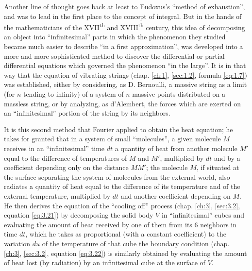 \documentclass[12pt,a4paper,leqno,twoside]{extbook}
\newcommand{\supth}{\texorpdfstring{\textsuperscript{th}}{th}}
\begin{document}
Another line of thought goes back at least to Eudoxus's ``method of exhaustion'', and was to lead in the first place to the concept of integral. But in the hands of the mathematicians of the XVII\supth{} and XVIII\supth{} century, this idea of decomposing an object into ``infinitesimal'' parts in which the phenomenon they studied became much easier to describe ``in a first approximation'', was developed into a more and more sophisticated method to discover the differential or partial differential equations which governed the phenomenon ``in the large''. It is in that way that the equation of vibrating strings (chap. \ref{ch:1}, \ref{sec:1.2}, formula \eqref{eq:1.7}) was established, either by considering, as D. Bernoulli, a massive string as a limit (for \(n\) tending to infinity) of a system of \(n\) massive points distributed on a massless string, or by analyzing, as d'Alembert, the forces which are exerted on an ``infinitesimal'' portion of the string by its neighbors.

It is this second method that Fourier applied to obtain the heat equation; he takes for granted that in a system of small ``molecules'', a given molecule \(M\) receives in an ``infinitesimal'' time \(dt\) a quantity of heat from another molecule \(M'\) equal to the difference of temperatures of \(M\) and \(M'\), multiplied by \(dt\) and by a coefficient depending only on the distance \(MM'\); the molecule \(M\), if situated at the surface separating the system of molecules from the external world, also radiates a quantity of heat equal to the difference of its temperature and of the external temperature, multiplied by \(dt\) and another coefficient depending on \(M\). He then derives the equation of the ``cooling off'' process (chap. \ref{ch:3}, \ref{sec:3.2}, equation \eqref{eq:3.21}) by decomposing the solid body \(V\) in ``infinitesimal'' cubes and evaluating the amount of heat received by one of them from its 6 neighbors in time \(dt\), which he takes as proportional (with a constant coefficient) to the variation \(du\) of the temperature of that cube the boundary condition (chap. \ref{ch:3}, \ref{sec:3.2}, equation \eqref{eq:3.22}) is similarly obtained by evaluating the amount of heat lost (by radiation) by an infinitesimal cube at the surface of \(V\).
\end{document}
